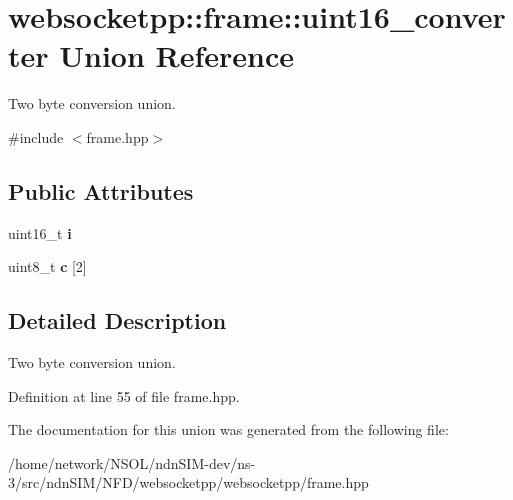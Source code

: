 \hypertarget{unionwebsocketpp_1_1frame_1_1uint16__converter}{}\section{websocketpp\+:\+:frame\+:\+:uint16\+\_\+converter Union Reference}
\label{unionwebsocketpp_1_1frame_1_1uint16__converter}


Two byte conversion union.  




{\ttfamily \#include $<$frame.\+hpp$>$}

\subsection*{Public Attributes}
\begin{DoxyCompactItemize}
\item 
uint16\+\_\+t {\bfseries i}\hypertarget{unionwebsocketpp_1_1frame_1_1uint16__converter_af60efc5747260bafeb6cd2b8ab267e2d}{}\label{unionwebsocketpp_1_1frame_1_1uint16__converter_af60efc5747260bafeb6cd2b8ab267e2d}

\item 
uint8\+\_\+t {\bfseries c} \mbox{[}2\mbox{]}\hypertarget{unionwebsocketpp_1_1frame_1_1uint16__converter_acac6733730c538163e39f4fed359168a}{}\label{unionwebsocketpp_1_1frame_1_1uint16__converter_acac6733730c538163e39f4fed359168a}

\end{DoxyCompactItemize}


\subsection{Detailed Description}
Two byte conversion union. 

Definition at line 55 of file frame.\+hpp.



The documentation for this union was generated from the following file\+:\begin{DoxyCompactItemize}
\item 
/home/network/\+N\+S\+O\+L/ndn\+S\+I\+M-\/dev/ns-\/3/src/ndn\+S\+I\+M/\+N\+F\+D/websocketpp/websocketpp/frame.\+hpp\end{DoxyCompactItemize}
